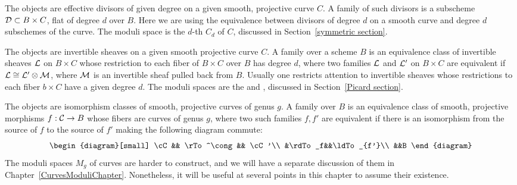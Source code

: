 
\begin{example} The objects are
%
%
effective divisors of given degree on a given smooth, projective curve
$C$. A family of such divisors is a subscheme ${\mathcal D} \subset B \times C$,
flat of degree $d$ over $B$.
Here we are using
the equivalence between divisors of degree $d$ on a smooth curve and
degree $d$ subschemes of the curve. The moduli space is the $d$-th
%
$C_d$ of $C$, discussed in Section~\ref{symmetric section}.
\end{example}

\begin{example} The objects are
%
invertible sheaves on a given smooth projective curve $C$. A family
over a scheme $B$ is an equivalence class of invertible sheaves ${\mathcal L}$
on $B \times C$ whose restriction to each fiber of $B \times C$ over
$B$ has degree $d$, where two families ${\mathcal L}$ and ${\mathcal L}'$ on $B \times
C$ are equivalent if ${\mathcal L}\cong {\mathcal L}' \otimes \mathcal M$, where $\mathcal M$ is  an
invertible sheaf pulled back from $B$. Usually one restricts attention
to invertible sheaves
whose restrictions to each fiber $b\times C$ have a given degree $d$.
%
%
The moduli spaces are the  and ,
discussed in
Section~\ref{Picard section}.
\end{example}

\begin{example} The objects are isomorphism
%
classes of smooth, projective curves of genus $g$. A family over $B$
is an equivalence class of smooth, projective morphisms $f : \mathcal C \to B$
whose fibers are curves of genus $g$, where two such families $f, f'$
are equivalent if there is an isomorphism from the source of $f$ to
the source
of $f'$ making the
following diagram commute:
$$
\begin{diagram}[small]
\cC && \rTo^\cong && \cC'\\
&\rdTo_f&&\ldTo_{f'}\\
&&B
\end{diagram}
\vspace*{3pt}
$$
The moduli spaces $M_g$ of curves are harder to construct, and we will
have a separate discussion of them in
Chapter~\ref{CurvesModuliChapter}. Nonetheless,
it will be useful at several points in this chapter to assume their
existence.
\end{example}

